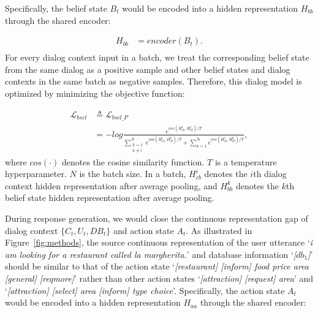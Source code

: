 Specifically, the belief state $B_t$ would be encoded into a hidden representation $H_{bb}$ through the shared encoder:

{\footnotesize
\setlength{\abovedisplayskip}{0.005cm}
\setlength{\belowdisplayskip}{0.005cm}
\begin{equation}
\begin{aligned}
H_{bb} &= encoder(B_{t}).\\
\end{aligned}
\end{equation}}%
For every dialog context input in a batch, we treat  the corresponding belief state from the same dialog  as a positive sample and other belief states and dialog contexts in the same batch as  negative samples.
Therefore, this dialog model is optimized by minimizing the objective function:

{\footnotesize
\setlength{\abovedisplayskip}{0.005cm}
\setlength{\belowdisplayskip}{0.005cm}
\begin{equation}
\begin{aligned}
\mathcal{L}_{bscl} &\triangleq \mathcal{L}_{bscl\_P}\\&= -log \frac{e^{cos(H_{cb}^i, H_{bb}^i)/T}}{\sum\limits_{\substack{k=1\\k\neq i}}^{N}\! e^{cos(H_{cb}^i,H_{cb}^k)/T} \!+ \!\sum\limits_{k=1}^{N}\! e^{cos(H_{cb}^i,H_{bb}^k)/T}},
\end{aligned}
\end{equation}}%
where $cos(\cdot)$ denotes the cosine similarity function. $T$ is a temperature hyperparameter. $N$ is the batch size.
In a batch, $H_{cb}^i$ denotes the $i$th dialog context hidden representation after average pooling, and $H_{bb}^k$ denotes the $k$th  belief state hidden representation after average pooling.

During response generation,  %
we would close the continuous representation gap of dialog context $\{C_t,U_t,DB_t\}$ and action state $A_t$. 
As illustrated in Figure~\ref{fig:methods}, the source continuous representation of the user utterance `\textit{i am looking for a restaurant called la margherita.}' 
and database information `\textit{[$db_1$]}' should be similar to that of the action state `\textit{[restaurant] [inform] food price area [general] [reqmore]}' rather than other action states  `\textit{[attraction] [request] area}' and `\textit{[attraction] [select] area [inform] type choice}'.
Specifically, the action state $A_t$ would be encoded into a hidden representation $H_{aa}$ through the shared encoder:


